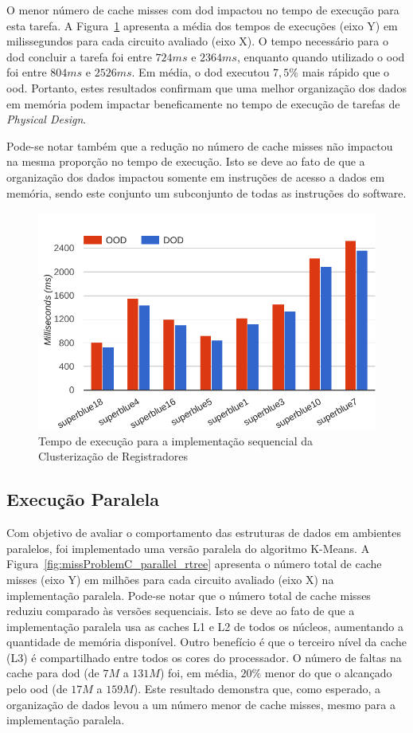 O menor número de cache misses com \ac{dod} impactou no tempo de execução para esta tarefa.
A Figura~\ref{fig:runtimeProblemC_sequential_rtree} apresenta a média dos tempos de execuções (eixo Y) em milissegundos para cada circuito avaliado (eixo X).
O tempo necessário para o \ac{dod} concluir a tarefa foi entre $724ms$ e $2364ms$, enquanto quando utilizado o \ac{ood} foi entre $804ms$ e $2526ms$.
Em média, o \ac{dod} executou $7,5\%$ mais rápido que o \ac{ood}.
Portanto, estes resultados confirmam que uma melhor organização dos dados em memória podem impactar beneficamente no tempo de execução de tarefas de \textit{Physical Design}.

Pode-se notar também que a redução no número de cache misses não impactou na mesma proporção no tempo de execução. Isto se deve ao fato de que a organização dos dados impactou somente em instruções de acesso a dados em memória, sendo este conjunto um subconjunto de todas as instruções do software.

\begin{figure}[ht]
    \centering
    \includegraphics[width=0.7\linewidth]{img/results/runtimeProblemC_sequential_rtree}
    \caption[Tempo de execução Problema~C versão sequencial]{Tempo de execução para a implementação sequencial da Clusterização de Registradores}
    \label{fig:runtimeProblemC_sequential_rtree}
\end{figure}

\subsection{Execução Paralela}
\label{subsec:execucaoParalelaProblemaC}

Com objetivo de avaliar o comportamento das estruturas de dados em ambientes paralelos, foi implementado uma versão paralela do algoritmo K-Means.
A Figura~\ref{fig:missProblemC_parallel_rtree} apresenta o número total de cache misses (eixo Y) em milhões para cada circuito avaliado (eixo X) na implementação paralela.
Pode-se notar que o número total de cache misses reduziu comparado às versões sequenciais. Isto se deve ao fato de que a implementação paralela usa as caches L1 e L2 de todos os núcleos, aumentando a quantidade de memória disponível. Outro benefício é que o terceiro nível da cache (L3) é compartilhado entre todos os cores do processador.
O número de faltas na cache para \ac{dod} (de $7M$ a $131M$) foi, em média, $20\%$ menor do que o alcançado pelo \ac{ood} (de $17M$ a $159M$). Este resultado demonstra que, como esperado, a organização de dados levou a um número menor de cache misses, mesmo para a implementação paralela.


